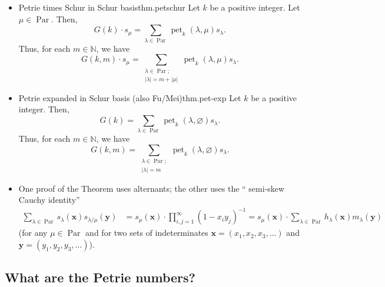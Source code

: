 \documentclass[numbers=enddot,12pt,final,onecolumn,notitlepage]{scrartcl}%
\newcommand{\Par}{\operatorname{Par}}
\newcommand{\0}{\phantom{c}}
\let\sumnonlimits\sum
\let\prodnonlimits\prod
\renewcommand{\sum}{\sumnonlimits\limits}
\renewcommand{\prod}{\prodnonlimits\limits}
\newcommand{\nowbox}{\hphantom{x} \vspace{-1.5pc}}
\begin{document}
\begin{itemize}
\item \nowbox
\begin{theorem}{Petrie times Schur in Schur basis}{thm.petschur}
Let $k$ be a positive integer. Let $\mu\in
\operatorname*{Par}$. Then,%
\[
G\left(  k\right)  \cdot s_{\mu}=\sum_{\lambda\in\operatorname*{Par}%
}\operatorname*{pet}\nolimits_{k}\left(  \lambda,\mu\right)  s_{\lambda}.
\]
Thus, for each $m\in\mathbb{N}$, we have%
\[
G\left(  k,m\right)  \cdot s_{\mu}
=
\sum_{\substack{\lambda\in\Par;\\ \left|\lambda\right| =
m+\left\vert \mu\right\vert}}
\operatorname*{pet}\nolimits_{k}%
\left(  \lambda,\mu\right)  s_{\lambda}.
\]
\end{theorem}

\item \nowbox
\begin{corollary}{Petrie expanded in Schur basis (also Fu/Mei)}{thm.pet-exp}
Let $k$ be a positive integer. Then,%
\[
G\left(  k\right)  =\sum_{\lambda\in\operatorname*{Par}}\operatorname*{pet}%
\nolimits_{k}\left(  \lambda,\varnothing\right)  s_{\lambda}.
\]
Thus, for each $m\in\mathbb{N}$, we have%
\[
G\left(  k,m\right)  =
\sum_{\substack{\lambda\in\Par;\\ \left|\lambda\right| = m}}
\operatorname*{pet}\nolimits_{k}\left(  \lambda,\varnothing\right)
s_{\lambda}.
\]
\end{corollary}

\item
One proof of the Theorem uses alternants; the other uses the \textquotedblleft
semi-skew Cauchy identity\textquotedblright%
\begin{align*}
\sum_{\lambda\in\operatorname*{Par}}s_{\lambda}\left(  \mathbf{x}\right)
s_{\lambda/\mu}\left(  \mathbf{y}\right)   &  =s_{\mu}\left(  \mathbf{x}%
\right)  \cdot\prod_{i,j=1}^{\infty}\left(  1-x_{i}y_{j}\right)  ^{-1}
  =s_{\mu}\left(  \mathbf{x}\right)  \cdot\sum_{\lambda\in\operatorname*{Par}%
}h_{\lambda}\left(  \mathbf{x}\right)  m_{\lambda}\left(  \mathbf{y}\right)
\end{align*}
(for any $\mu\in\operatorname*{Par}$ and for two sets of indeterminates
$\mathbf{x}=\left(  x_{1},x_{2},x_{3},\ldots\right)  $ and $\mathbf{y}=\left(
y_{1},y_{2},y_{3},\ldots\right)  $).
\end{itemize}

\subsection{What are the Petrie numbers?}
\end{document}
